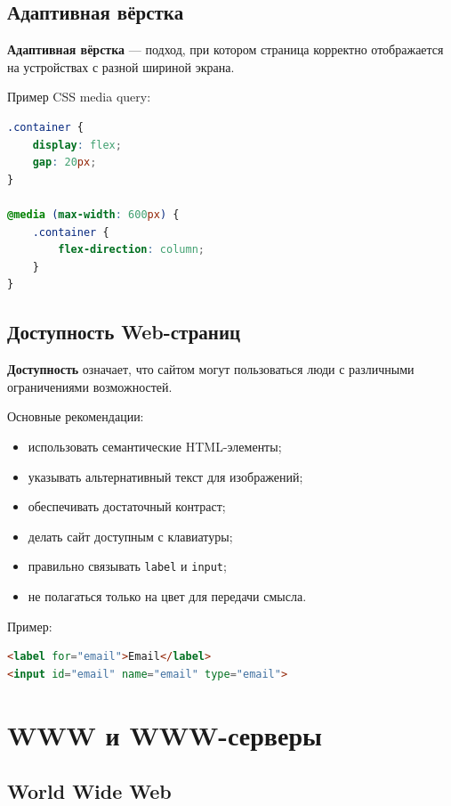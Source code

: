 \documentclass[12pt,a4paper]{article}
\begin{document}
\subsection{Адаптивная вёрстка}

\textbf{Адаптивная вёрстка} --- подход, при котором страница корректно отображается на устройствах с разной шириной экрана.

Пример CSS media query:
\begin{lstlisting}[language=CSS]
.container {
    display: flex;
    gap: 20px;
}

@media (max-width: 600px) {
    .container {
        flex-direction: column;
    }
}
\end{lstlisting}

\subsection{Доступность Web-страниц}

\textbf{Доступность} означает, что сайтом могут пользоваться люди с различными ограничениями возможностей.

Основные рекомендации:
\begin{itemize}
    \item использовать семантические HTML-элементы;
    \item указывать альтернативный текст для изображений;
    \item обеспечивать достаточный контраст;
    \item делать сайт доступным с клавиатуры;
    \item правильно связывать \texttt{label} и \texttt{input};
    \item не полагаться только на цвет для передачи смысла.
\end{itemize}

Пример:
\begin{lstlisting}[language=HTML]
<label for="email">Email</label>
<input id="email" name="email" type="email">
\end{lstlisting}

\section{WWW и WWW-серверы}

\subsection{World Wide Web}
\end{document}
